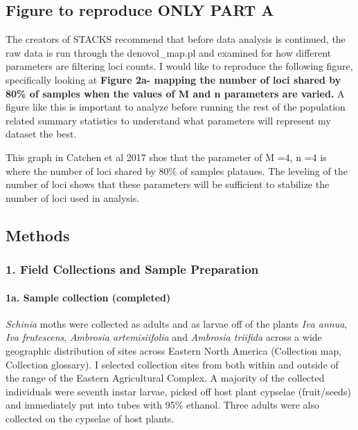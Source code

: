 \subsection{Figure to reproduce \textbf{ONLY PART
A}}\label{figure-to-reproduce-only-part-a}

The creators of STACKS recommend that before data analysis is continued,
the raw data is run through the denovol\_map.pl and examined for how
different parameters are filtering loci counts. I would like to
reproduce the following figure, specifically looking at \textbf{Figure
2a- mapping the number of loci shared by 80\% of samples when the values
of M and n parameters are varied.} A figure like this is important to
analyze before running the rest of the population related summary
statistics to understand what parameters will represent my dataset the
best.

This graph in Catchen et al 2017 shos that the parameter of M =4, n =4
is where the number of loci shared by 80\% of samples plataues. The
leveling of the number of loci shows that these parameters will be
sufficient to stabilize the number of loci used in analysis.

\subsection{Methods}\label{methods}

\subsubsection{1. Field Collections and Sample
Preparation}\label{field-collections-and-sample-preparation}

\paragraph{1a. Sample collection
(completed)}\label{a.-sample-collection-completed}

\emph{Schinia} moths were collected as adults and as larvae off of the
plants \emph{Iva annua}, \emph{Iva frutescens}, \emph{Ambrosia
artemisiifolia} and \emph{Ambrosia triifida} across a wide geographic
distribution of sites across Eastern North America (Collection map,
Collection glossary). I selected collection sites from both within and
outside of the range of the Eastern Agricultural Complex. A majority of
the collected individuals were seventh instar larvae, picked off host
plant cypselae (fruit/seeds) and immediately put into tubes with 95\%
ethanol. Three adults were also collected on the cypselae of host
plants.

